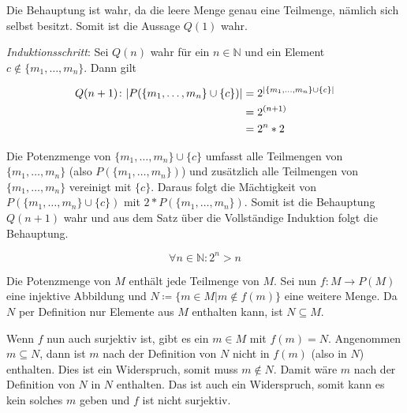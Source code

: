 \documentclass{article}
\begin{document}
 Die Behauptung ist wahr, da die leere Menge genau eine Teilmenge, nämlich sich selbst besitzt. Somit ist die Aussage $Q(1)$ wahr.

\emph{Induktionsschritt}: Sei $Q(n)$ wahr für ein $n \in \mathbb{N}$ und ein Element $c \notin \{m_1, \ldots, m_n\}$. Dann gilt

\begin{align*}
  Q(n + 1) \colon \abs{P(\{m_1, \ldots, m_n \} \cup \{ c \})} &= 2^{\abs{\{m_1, \ldots, m_n \} \cup \{ c \}}} \\
                                                              &= 2^{(n + 1)} \\
                                                              &=2^n * 2 \\
\end{align*}

Die Potenzmenge von $\{m_1, \ldots, m_n\} \cup \{ c \}$ umfasst alle Teilmengen von $\{m_1, \ldots, m_n\}$ (also $P(\{m_1, \ldots, m_n\})$)
und zusätzlich alle Teilmengen von $\{m_1, \ldots, m_n\}$ vereinigt mit $\{ c \}$. Daraus folgt die Mächtigkeit von
$P(\{m_1, \ldots, m_n\} \cup \{ c \})$ mit $2 * P(\{m_1, \ldots, m_n\})$. Somit ist die Behauptung $Q(n + 1)$ wahr und
aus dem Satz über die Vollständige Induktion folgt die Behauptung.

\[
  \forall n \in \mathbb{N} \colon 2^n > n
\]


Die Potenzmenge von $M$ enthält jede Teilmenge von $M$. Sei nun $f \colon M \to P(M)$
eine injektive Abbildung und $N \coloneqq \{ m \in M | m \notin f(m)\}$ eine weitere Menge.
Da $N$ per Definition nur Elemente aus $M$ enthalten kann, ist $N \subseteq M$.

Wenn $f$ nun auch surjektiv ist, gibt es ein $m \in M$ mit $f(m) = N$.
Angenommen $m \subseteq N$, dann ist $m$ nach der Definition von $N$ nicht in $f(m)$ (also in $N$) enthalten.
Dies ist ein Widerspruch, somit muss $m \notin N$. Damit wäre $m$ nach der Definition von $N$ in $N$ enthalten.
Das ist auch ein Widerspruch, somit kann es kein solches $m$ geben und $f$ ist nicht surjektiv.
\end{document}
